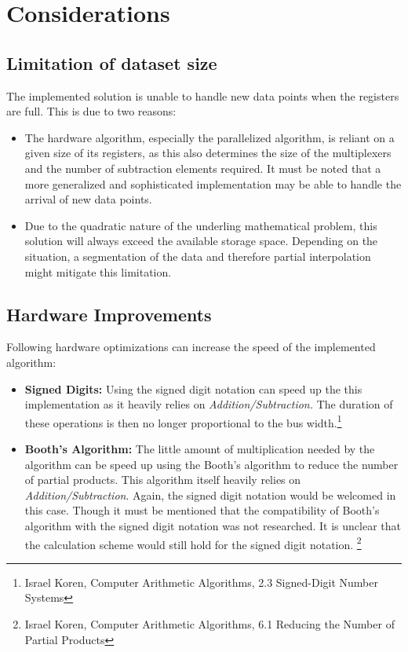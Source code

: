\section{Considerations}

\subsection{Limitation of dataset size}
The implemented solution is unable to handle new data points when the
registers are full. This is due to two reasons:

\begin{itemize}
	\item The hardware algorithm, especially the parallelized algorithm, is
		reliant on a given size of its registers, as this also
		determines the size of the multiplexers and the number of
		subtraction elements required. It must be noted that a more
		generalized and sophisticated implementation may be able to
		handle the arrival of new data points.

	\item Due to the quadratic nature of the underling mathematical problem,
		this solution will always exceed the available storage space.
		Depending on the situation, a segmentation of the data and
		therefore partial interpolation might mitigate this limitation.
\end{itemize}


\subsection{Hardware Improvements}

Following hardware optimizations can increase the speed of the implemented
algorithm:

\begin{itemize}
	\item \textbf{Signed Digits:} Using the signed digit notation can speed
		up the this implementation as it heavily relies on
		\textit{Addition/Subtraction.} The duration of these operations
		is then no longer proportional to the bus width.\footnote{Israel
		Koren, Computer Arithmetic Algorithms, 2.3 Signed-Digit Number
		Systems}

	\item \textbf{Booth's Algorithm:} The little amount of multiplication
		needed by the algorithm can be speed up using the Booth's
		algorithm to reduce the number of partial products. This
		algorithm itself heavily relies on
		\textit{Addition/Subtraction}. Again, the signed digit notation
		would be welcomed in this case. Though it must be mentioned that
		the compatibility of Booth's algorithm with the signed digit
		notation was not researched. It is unclear that the calculation
		scheme would still hold for the signed digit notation.
		\footnote{Israel Koren, Computer Arithmetic Algorithms,
		6.1 Reducing the Number of Partial Products}
\end{itemize}
